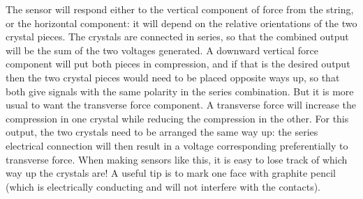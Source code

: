   The sensor will respond either to the vertical component of force from the 
  string, or the horizontal component: it will depend on the relative 
  orientations of the two crystal pieces. The crystals are connected in series, 
  so that the combined output will be the sum of the two voltages generated. A 
  downward vertical force component will put both pieces in compression, and if 
  that is the desired output then the two crystal pieces would need to be 
  placed opposite ways up, so that both give signals with the same polarity in 
  the series combination. But it is more usual to want the transverse force 
  component. A transverse force will increase the compression in one crystal 
  while reducing the compression in the other. For this output, the two 
  crystals need to be arranged the same way up: the series electrical 
  connection will then result in a voltage corresponding preferentially to 
  transverse force. When making sensors like this, it is easy to lose track of 
  which way up the crystals are! A useful tip is to mark one face with graphite 
  pencil (which is electrically conducting and will not interfere with the 
  contacts). 
